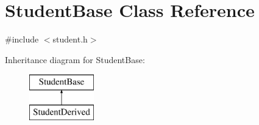 \hypertarget{class_student_base}{}\section{Student\+Base Class Reference}
\label{class_student_base}


{\ttfamily \#include $<$student.\+h$>$}

Inheritance diagram for Student\+Base\+:\begin{figure}[H]
\begin{center}
\leavevmode
\includegraphics[height=2.000000cm]{class_student_base}
\end{center}
\end{figure}
